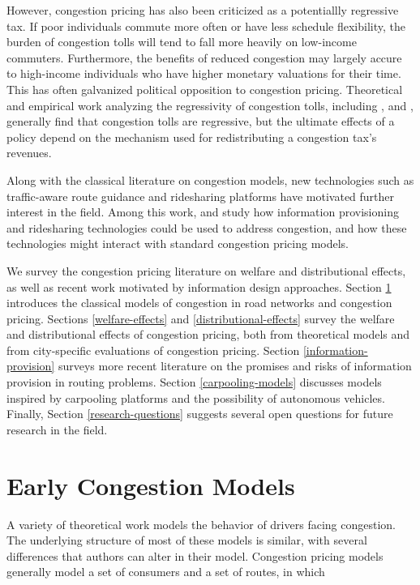 \documentclass[JEL]{AEA}
\begin{document}
However, congestion pricing has also been criticized as a potentiallly regressive tax. If poor individuals commute more often or have less schedule flexibility, the burden of congestion tolls will tend to fall more heavily on low-income commuters. Furthermore, the benefits of reduced congestion may largely accure to high-income individuals who have higher monetary valuations for their time. This has often galvanized political opposition to congestion pricing. Theoretical and empirical work analyzing the regressivity of congestion tolls, including \cite{arnott-1994}, \cite{small-1983} and \cite{eliasson-2006}, generally find that congestion tolls are regressive, but the ultimate effects of a policy depend on the mechanism used for redistributing a congestion tax's revenues.

Along with the classical literature on congestion models, new technologies such as traffic-aware route guidance and ridesharing platforms have motivated further interest in the field. Among this work, \cite{das-2017} and \cite{ostrovsky-2018} study how information provisioning and ridesharing technologies could be used to address congestion, and how these technologies might interact with standard congestion pricing models.


We survey the congestion pricing literature on welfare and distributional effects, as well as recent work motivated by information design approaches. Section \ref{early-congestion-models} introduces the classical models of congestion in road networks and congestion pricing. Sections \ref{welfare-effects} and \ref{distributional-effects} survey the welfare and distributional effects of congestion pricing, both from theoretical models and from city-specific evaluations of congestion pricing. Section \ref{information-provision} surveys more recent literature on the promises and risks of information provision in routing problems. Section \ref{carpooling-models} discusses models inspired by carpooling platforms and the possibility of autonomous vehicles. Finally, Section \ref{research-questions} suggests several open questions for future research in the field.

\section{Early Congestion Models}
\label{early-congestion-models}

A variety of theoretical work models the behavior of drivers facing congestion. The underlying structure of most of these models is similar, with several differences that authors can alter in their model. Congestion pricing models generally model a set of consumers and a set of routes, in which 
\end{document}

